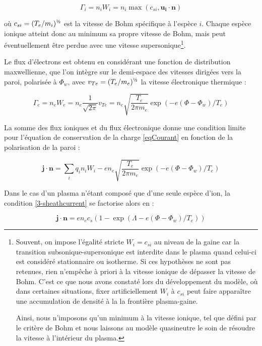 \begin{refsection}
\begin{equation}
\label{3-fluxIonique}
\Gamma_i=n_iW_i=n_i\max\left(c_{si},\mathbf{u_i}\cdot\mathbf{n}\right)
\end{equation}

où $c_{si}=(T_e/m_i)^{\text{\textonehalf}}$ est la vitesse de Bohm
spécifique à l'espèce $i$.
Chaque espèce ionique atteint donc au minimum sa propre vitesse de Bohm, mais
peut éventuellement être perdue avec une vitesse
supersonique\footnote{Souvent, on impose l'égalité stricte $W_i=c_{si}$ au
niveau de la gaine car la transition subsonique-supersonique est interdite dans
le plasma quand celui-ci est considéré stationnaire ou isotherme. Si ces
hypothèses ne sont pas retenues, rien n'empêche à priori à la vitesse ionique de
dépasser la vitesse de Bohm. C'est ce que nous avons constaté lors du
développement du modèle, où dans certaines situations, fixer artificiellement
$W_i$ à $c_{si}$ peut faire apparaître une accumulation de densité à la la
frontière plasma-gaine.

Ainsi, nous n'imposons qu'un minimum à la vitesse ionique, tel que défini par
le critère de Bohm et nous laissons au modèle quasineutre le soin de résoudre la
vitesse à l'intérieur du plasma.}. 

Le flux d'électrons est obtenu en considérant une fonction de distribution
maxwellienne, que l'on intègre sur le demi-espace des vitesses dirigées vers la
paroi, polarisée à $\Phi_w$, avec $v_{Te}=(T_e/m_e)^{\text{\textonehalf}}$ la
vitesse électronique thermique :

\begin{equation}
\Gamma_e=n_eW_e=n_e\frac{1}{\sqrt{2\pi}}v_{Te}=n_e\sqrt{\frac{T_e}{2\pi
m_e}}\exp(-e(\Phi-\Phi_w)/T_e)
\end{equation}

La somme des flux
ioniques et du flux électronique donne une condition limite pour l'équation de
conservation de la charge \eqref{eqCourant} en fonction de la polarisation de la paroi
:

\begin{equation}
\label{3-sheathcurrent}
\mathbf{j}\cdot\mathbf{n}=\sum_i{q_in_iW_i}
-en_e\sqrt{\frac{T_e}{2\pi
m_e}}\exp(-e(\Phi-\Phi_w)/T_e)
\end{equation}

Dans
le cas d'un plasma n'étant composé que d'une seule espèce d'ion, 
la condition \ref{3-sheathcurrent} se factorise alors en :

\begin{equation}
\mathbf{j}\cdot\mathbf{n}=en_ec_s(1-\exp(\Lambda-e(\Phi-\Phi_w)/T_e))
\end{equation}


\end{refsection}
